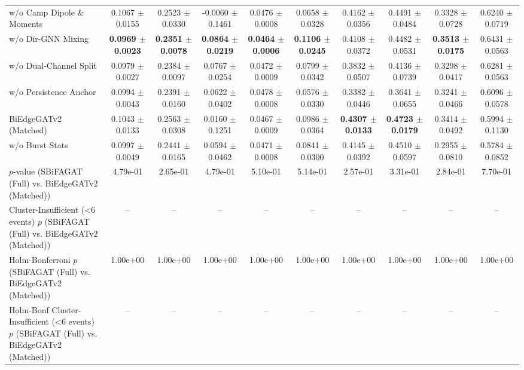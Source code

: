 \begin{table}[t]
{\begin{tabular}{lccccccccc}
w/o Camp Dipole \& Moments & 0.1067 $\pm$ 0.0155 & 0.2523 $\pm$ 0.0330 & -0.0060 $\pm$ 0.1461 & 0.0476 $\pm$ 0.0008 & 0.0658 $\pm$ 0.0328 & 0.4162 $\pm$ 0.0356 & 0.4491 $\pm$ 0.0484 & 0.3328 $\pm$ 0.0728 & 0.6240 $\pm$ 0.0719 \\
w/o Dir-GNN Mixing & \textbf{0.0969 $\pm$ 0.0023} & \textbf{0.2351 $\pm$ 0.0078} & \textbf{0.0864 $\pm$ 0.0219} & \textbf{0.0464 $\pm$ 0.0006} & \textbf{0.1106 $\pm$ 0.0245} & 0.4108 $\pm$ 0.0372 & 0.4482 $\pm$ 0.0531 & \textbf{0.3513 $\pm$ 0.0175} & 0.6431 $\pm$ 0.0563 \\
w/o Dual-Channel Split & 0.0979 $\pm$ 0.0027 & 0.2384 $\pm$ 0.0097 & 0.0767 $\pm$ 0.0254 & 0.0472 $\pm$ 0.0009 & 0.0799 $\pm$ 0.0342 & 0.3832 $\pm$ 0.0507 & 0.4136 $\pm$ 0.0739 & 0.3298 $\pm$ 0.0417 & 0.6281 $\pm$ 0.0563 \\
w/o Persistence Anchor & 0.0994 $\pm$ 0.0043 & 0.2391 $\pm$ 0.0160 & 0.0622 $\pm$ 0.0402 & 0.0478 $\pm$ 0.0008 & 0.0576 $\pm$ 0.0330 & 0.3382 $\pm$ 0.0446 & 0.3641 $\pm$ 0.0655 & 0.3241 $\pm$ 0.0466 & 0.6096 $\pm$ 0.0578 \\
BiEdgeGATv2 (Matched) & 0.1043 $\pm$ 0.0133 & 0.2563 $\pm$ 0.0308 & 0.0160 $\pm$ 0.1251 & 0.0467 $\pm$ 0.0009 & 0.0986 $\pm$ 0.0364 & \textbf{0.4307 $\pm$ 0.0133} & \textbf{0.4723 $\pm$ 0.0179} & 0.3414 $\pm$ 0.0492 & 0.5994 $\pm$ 0.1130 \\
w/o Burst Stats & 0.0997 $\pm$ 0.0049 & 0.2441 $\pm$ 0.0165 & 0.0594 $\pm$ 0.0462 & 0.0471 $\pm$ 0.0008 & 0.0841 $\pm$ 0.0300 & 0.4145 $\pm$ 0.0392 & 0.4510 $\pm$ 0.0597 & 0.2955 $\pm$ 0.0810 & 0.5784 $\pm$ 0.0852 \\
\midrule
$p$-value (SBiFAGAT (Full) vs. BiEdgeGATv2 (Matched)) & 4.79e-01 & 2.65e-01 & 4.79e-01 & 5.10e-01 & 5.14e-01 & 2.57e-01 & 3.31e-01 & 2.84e-01 & 7.70e-01 \\
Cluster-Insufficient (<6 events) $p$ (SBiFAGAT (Full) vs. BiEdgeGATv2 (Matched)) & -- & -- & -- & -- & -- & -- & -- & -- & -- \\
Holm-Bonferroni $p$ (SBiFAGAT (Full) vs. BiEdgeGATv2 (Matched)) & 1.00e+00 & 1.00e+00 & 1.00e+00 & 1.00e+00 & 1.00e+00 & 1.00e+00 & 1.00e+00 & 1.00e+00 & 1.00e+00 \\
Holm-Bonf Cluster-Insufficient (<6 events) $p$ (SBiFAGAT (Full) vs. BiEdgeGATv2 (Matched)) & -- & -- & -- & -- & -- & -- & -- & -- & -- \\
\bottomrule
\end{tabular}
}
\end{table}
